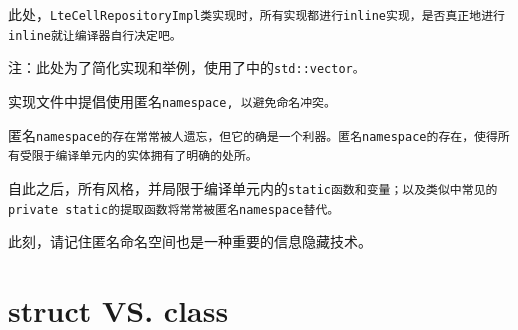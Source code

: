 \begin{content}
此处，\tt{LteCellRepositoryImpl}类实现时，所有实现都进行\tt{inline}实现，是否真正地进行\tt{inline}就让编译器自行决定吧。

注：此处为了简化实现和举例，使用了中的\tt{std::vector}。

\begin{regulation}
实现文件中提倡使用匿名\tt{namespace}, 以避免命名冲突。
\end{regulation}

匿名\tt{namespace}的存在常常被人遗忘，但它的确是一个利器。匿名\tt{namespace}的存在，使得所有受限于编译单元内的实体拥有了明确的处所。

自此之后，所有\clang{}风格，并局限于编译单元内的\tt{static}函数和变量；以及类似中常见的\tt{private static}的提取函数将常常被匿名\tt{namespace}替代。

此刻，请记住匿名命名空间也是一种重要的信息隐藏技术。

\end{content}

\section{struct VS. class}

